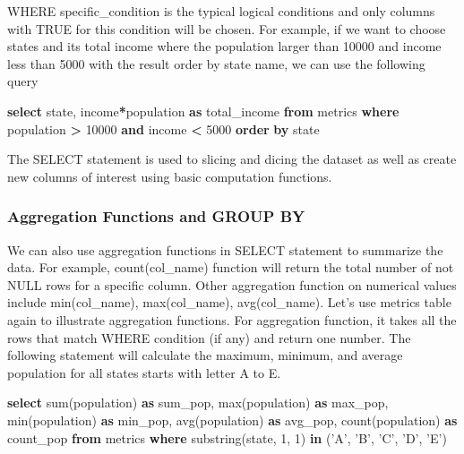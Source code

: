 \documentclass[
]{article}
\newenvironment{Shaded}{\begin{snugshade}}{\end{snugshade}}
\newcommand{\DecValTok}[1]{\textcolor[rgb]{0.00,0.00,0.81}{#1}}
\newcommand{\FunctionTok}[1]{\textcolor[rgb]{0.00,0.00,0.00}{#1}}
\newcommand{\KeywordTok}[1]{\textcolor[rgb]{0.13,0.29,0.53}{\textbf{#1}}}
\newcommand{\NormalTok}[1]{#1}
\newcommand{\OperatorTok}[1]{\textcolor[rgb]{0.81,0.36,0.00}{\textbf{#1}}}
\newcommand{\StringTok}[1]{\textcolor[rgb]{0.31,0.60,0.02}{#1}}
\begin{document}
WHERE specific\_condition is the typical logical conditions and only
columns with TRUE for this condition will be chosen. For example, if we
want to choose states and its total income where the population larger
than 10000 and income less than 5000 with the result order by state
name, we can use the following query

\begin{Shaded}
\begin{Highlighting}[]
\KeywordTok{select}\NormalTok{ state, income}\OperatorTok{*}\NormalTok{population }\KeywordTok{as}\NormalTok{ total_income  }
\KeywordTok{from}\NormalTok{ metrics}
\KeywordTok{where}\NormalTok{ population }\OperatorTok{>} \DecValTok{10000} \KeywordTok{and}\NormalTok{ income }\OperatorTok{<} \DecValTok{5000}
\KeywordTok{order} \KeywordTok{by}\NormalTok{ state}
\end{Highlighting}
\end{Shaded}

The SELECT statement is used to slicing and dicing the dataset as well
as create new columns of interest using basic computation functions.

\hypertarget{aggregation-functions-and-group-by}{%
\subsubsection{Aggregation Functions and GROUP
BY}\label{aggregation-functions-and-group-by}}

We can also use aggregation functions in SELECT statement to summarize
the data. For example, count(col\_name) function will return the total
number of not NULL rows for a specific column. Other aggregation
function on numerical values include min(col\_name), max(col\_name),
avg(col\_name). Let's use metrics table again to illustrate aggregation
functions. For aggregation function, it takes all the rows that match
WHERE condition (if any) and return one number. The following statement
will calculate the maximum, minimum, and average population for all
states starts with letter A to E.

\begin{Shaded}
\begin{Highlighting}[]
\KeywordTok{select} \FunctionTok{sum}\NormalTok{(population) }\KeywordTok{as}\NormalTok{ sum_pop, }\FunctionTok{max}\NormalTok{(population) }\KeywordTok{as} 
\NormalTok{    max_pop, }\FunctionTok{min}\NormalTok{(population) }\KeywordTok{as}\NormalTok{ min_pop, }\FunctionTok{avg}\NormalTok{(population)}
    \KeywordTok{as}\NormalTok{ avg_pop, }\FunctionTok{count}\NormalTok{(population) }\KeywordTok{as}\NormalTok{ count_pop}
\KeywordTok{from}\NormalTok{ metrics}
\KeywordTok{where}\NormalTok{ substring(state, }\DecValTok{1}\NormalTok{, }\DecValTok{1}\NormalTok{) }\KeywordTok{in}\NormalTok{ (}\StringTok{'A'}\NormalTok{, }\StringTok{'B'}\NormalTok{, }\StringTok{'C'}\NormalTok{, }\StringTok{'D'}\NormalTok{, }\StringTok{'E'}\NormalTok{)}
\end{Highlighting}
\end{Shaded}
\end{document}
